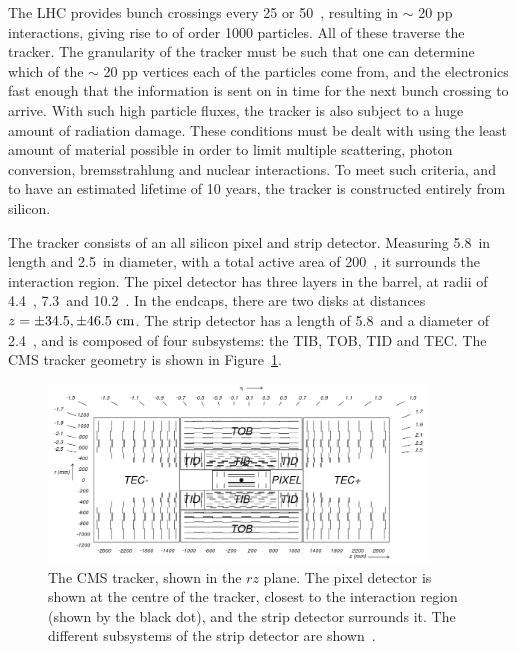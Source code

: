 The \ac{LHC} provides bunch crossings every 25 or 50~\ns, resulting in $\sim$ 20 pp interactions, giving rise to of order 1000 particles. 
All of these traverse the tracker. 
The granularity of the tracker must be such that one can determine which of the $\sim$ 20 pp vertices each of the particles come from, 
and the electronics fast enough that the information is sent on in time for the next bunch crossing to arrive.
With such high particle fluxes, the tracker is also subject to a huge amount of radiation damage.
These conditions must be dealt with using the least amount of material possible in order to limit multiple scattering, photon conversion, bremsstrahlung and nuclear interactions.
To meet such criteria, and to have an estimated lifetime of 10 years, the tracker is constructed entirely from silicon.

The tracker consists of an all silicon pixel and strip detector.
Measuring 5.8~\m in length and 2.5~\m in diameter, with a total active area of 200~\msq, it surrounds the interaction region.
The pixel detector has three layers in the barrel, at radii of 4.4~\cm, 7.3~\cm and 10.2~\cm. In the endcaps, there are two disks at distances $z=\pm 34.5, \pm 46.5~\mathrm{cm}$.
The strip detector has a length of 5.8~\m and a diameter of 2.4~\m, and is composed of four subsystems: the \ac{TIB}, \ac{TOB}, \ac{TID} and \ac{TEC}. The \ac{CMS} tracker geometry is shown in Figure~\ref{fig:CMStracker}.

\begin{figure}[htbp]
  \begin{center}
  \includegraphics[width=0.9\textwidth]{Figures/detector/fig_cmstracker}
  \caption{The \ac{CMS} tracker, shown in the $rz$ plane. The pixel detector is shown at the centre of the tracker, closest to the interaction region (shown by the black dot), and the strip detector surrounds it. The different subsystems of the strip detector are shown~\cite{Chatrchyan:2008zzk}.
}
  \label{fig:CMStracker}
  \end{center}
\end{figure}

